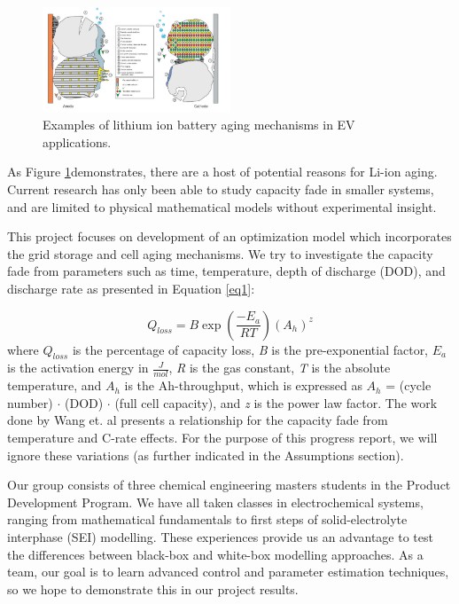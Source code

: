 \documentclass[10]{IEEEtran}
\begin{document}
	\begin{figure}[htbp]
		\centerline{\includegraphics[keepaspectratio,height=0.5\textheight, width=0.5\textwidth]{fig1.png}}
		\caption{Examples of lithium ion battery aging mechanisms in EV applications.\cite{b4}}
		\label{f1}
	\end{figure}
	
	As Figure \ref{f1}demonstrates, there are a host of potential reasons for Li-ion aging. Current research has only been able to study capacity fade in smaller systems, and are limited to physical mathematical models without experimental insight.
	
	This project focuses on development of an optimization model which incorporates the grid storage and cell aging mechanisms. We try to investigate the capacity fade from parameters such as time, temperature, depth of discharge (DOD), and discharge rate as presented in Equation \ref{eq1}\cite{b5}:
	
	\begin{equation}\label{eq1}
	Q_{loss} = B\exp(\frac{-E_a}{RT})(A_h)^z
	\end{equation}
	where $Q_{loss}$ is the percentage of capacity loss, \textit{B} is the pre-exponential factor, $E_a$ is the activation energy in $\frac{J}{mol}$, \textit{R} is the gas constant, \textit{T} is the absolute temperature, and $A_h$ is the Ah-throughput, which is expressed as $A_h$ = (cycle number) $\cdot$ (DOD) $\cdot$ (full cell capacity), and \textit{z} is the power law factor. The work done by Wang et. al presents a relationship for the capacity fade from temperature and C-rate effects. For the purpose of this progress report, we will ignore these variations (as further indicated in the Assumptions section).
	
	Our group consists of three chemical engineering masters students in the Product Development Program. We have all taken classes in electrochemical systems, ranging from mathematical fundamentals to first steps of solid-electrolyte interphase (SEI) modelling. These experiences provide us an advantage to test the differences between black-box and white-box modelling approaches. As a team, our goal is to learn advanced control and parameter estimation techniques, so we hope to demonstrate this in our project results.
	
\end{document}
